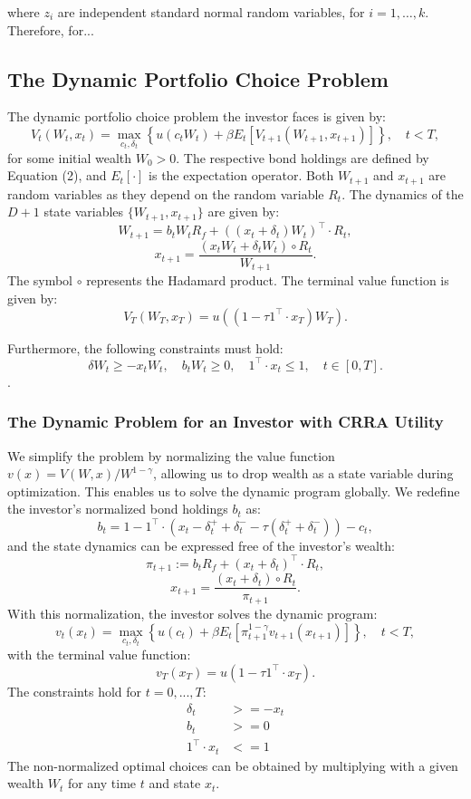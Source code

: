 \documentclass[10pt,a4paper]{article}
\numberwithin{equation}{section} %
\begin{document}
where \(z_i\) are independent standard normal random variables, for \(i = 1, \dots, k\). Therefore, for...
\subsection{The Dynamic Portfolio Choice Problem}

The dynamic portfolio choice problem the investor faces is given by:
\[
V_t(W_t, x_t) = \max_{c_t, \delta_t} \left\{ u(c_t W_t) + \beta E_t \left[ V_{t+1}(W_{t+1}, x_{t+1}) \right] \right\}, \quad t < T,
\]
for some initial wealth $W_0 > 0$. The respective bond holdings are defined by Equation (2), and $E_t[\cdot]$ is the expectation operator. Both $W_{t+1}$ and $x_{t+1}$ are random variables as they depend on the random variable $R_t$. The dynamics of the $D+1$ state variables $\{W_{t+1}, x_{t+1}\}$ are given by:
\[
W_{t+1} = b_t W_t R_f + \left( (x_t + \delta_t) W_t \right)^\top \cdot R_t,
\]
\[
x_{t+1} = \frac{(x_t W_t + \delta_t W_t) \circ R_t}{W_{t+1}}.
\]
The symbol $\circ$ represents the Hadamard product. The terminal value function is given by:
\[
V_T(W_T, x_T) = u\left( (1 - \tau 1^\top \cdot x_T) W_T \right).
\]

Furthermore, the following constraints must hold:
\[
\delta W_t \geq -x_t W_t, \quad b_t W_t \geq 0, \quad 1^\top \cdot x_t \leq 1, \quad t \in [0, T].
\].

\subsubsection{The Dynamic Problem for an Investor with CRRA Utility}

We simplify the problem by normalizing the value function $v(x) = V(W,x) / W^{1-\gamma}$, allowing us to drop wealth as a state variable during optimization. This enables us to solve the dynamic program globally. We redefine the investor’s normalized bond holdings $b_t$ as:
\[
b_t = 1 - 1^\top \cdot (x_t - \delta^+_t + \delta^-_t - \tau (\delta^+_t + \delta^-_t)) - c_t,
\]
and the state dynamics can be expressed free of the investor’s wealth:
\[
\pi_{t+1} := b_t R_f + (x_t + \delta_t)^\top \cdot R_t,
\]
\[
x_{t+1} = \frac{(x_t + \delta_t) \circ R_t}{\pi_{t+1}}.
\]
With this normalization, the investor solves the dynamic program:
\[
v_t(x_t) = \max_{c_t, \delta_t} \left\{ u(c_t) + \beta E_t \left[ \pi_{t+1}^{1-\gamma} v_{t+1}(x_{t+1}) \right] \right\}, \quad t < T,
\]
with the terminal value function:
\[
v_T(x_T) = u(1 - \tau 1^\top \cdot x_T).
\]
The constraints hold for $t = 0,...,T$:
\begin{align}
    \delta_t &>= -x_t \\
    b_t &>= 0 \\
    1^\top \cdot x_t &<= 1
\end{align}
The non-normalized optimal choices can be obtained by multiplying with a given wealth $W_t$ for any time $t$ and state $x_t$.
\end{document}

